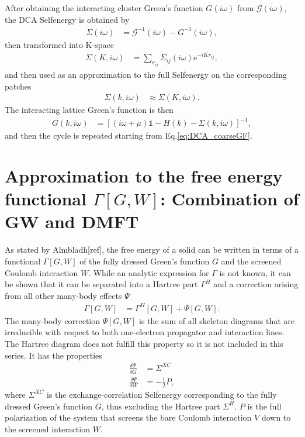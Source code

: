 \documentclass[12pt,a4paper]{scrartcl}
\numberwithin{equation}{section}
\newcommand{\unity}{\mathds{1}}
\begin{document}
After obtaining the interacting cluster Green's function $G(i\omega)$ from  $\mathscr{G}(i\omega)$,
the DCA Selfenergy is obtained by
\begin{align}
\Sigma(i\omega) &= \mathscr{G}^{-1}(i\omega) - G^{-1}(i\omega),
\end{align}
then transformed into K-space
\begin{align}
 \Sigma(K,i\omega) &= \sum_{r_{ij}} \Sigma_{ij}(i\omega) \mathrm{e}^{-iKr_{ij}},
\end{align}
and then used as an approximation to the full Selfenergy on the corresponding patches
\begin{align}
 \Sigma(k,i\omega) &\approx \Sigma(K,i\omega).
\end{align}
The interacting lattice Green's function is then
\begin{align}
 G(k,i\omega)
 &= [(i\omega+\mu) \unity - H(k) - \Sigma(k,i\omega)]^{-1},
\end{align}
and then the cycle is repeated starting from Eq.\eqref{eq:DCA_coarseGF}.


\clearpage
 
 
\section{Approximation to the free energy functional $\Gamma[G,W]$: Combination of GW and DMFT}
As stated by Almbladh[ref], the free energy of a solid can be written in terms of
a functional $\Gamma[G,W]$ of the fully dressed Green's function $G$
and the screened Coulomb interaction $W$. While an analytic expression for 
$\Gamma$ is not known, it can be shown that it can be separated into 
a Hartree part $\Gamma^H$ and a correction arising from all other many-body effects
$\Psi$
\begin{align}
\Gamma[G,W] &= \Gamma^H[G,W] + \Psi[G,W].
\end{align}
The many-body correction $\Psi[G,W]$ is the sum of all skeleton diagrams that are
irreducible with respect to both one-electron propagator and
interaction lines. The Hartree diagram does not fulfill
this property so it is not included in this series. 
It has the properties
\begin{align}
\frac{\delta \Psi}{\delta G} &= \Sigma^{XC}  \label{eq:sigma_from_psi} \\
\frac{\delta \Psi}{\delta W} &= -\frac{1}{2}P \label{eq:p_from_psi},
\end{align}
where $\Sigma^{XC}$ is the exchange-correlation Selfenergy corresponding to the
fully dressed Green's function $G$, thus excluding the Hartree part $\Sigma^H$.
$P$ is the full polarization of the system that screens the bare Coulomb
interaction $V$ down to the screened interaction $W$.
\end{document}
